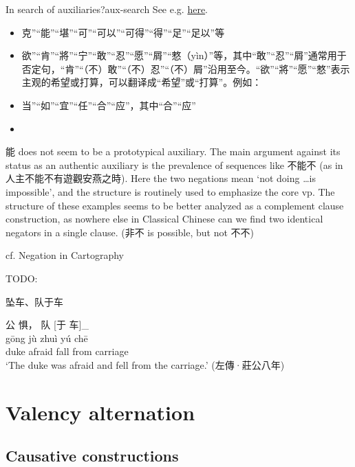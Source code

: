 \documentclass[UTF8, a4paper, oneside, scheme=plain, 12pt]{ctexrep}
\newcommand{\translate}[1]{`#1'}
\begin{document}
\begin{todobox}{In search of auxiliaries?}{aux-search}
    See e.g. \href{http://www.ziyexing.com/files-5/guhanyu/guhanyu_3_1.htm}{here}.
    \begin{itemize}
        \item 克”“能”“堪”“可”“可以”“可得”“得”“足”“足以”等
        \item 欲”“肯”“將”“宁”“敢”“忍”“愿”“屑”“憗（yìn）”等，其中“敢”“忍”“屑”通常用于否定句，“肯”“（不）敢”“（不）忍”“（不）屑”沿用至今。“欲”“將”“愿”“憗”表示主观的希望或打算，可以翻译成“希望”或“打算”。例如：
        \item 当”“如”“宜”“任”“合”“应”，其中“合”“应”
        \item 
    \end{itemize}
    
    能 does not seem to be a prototypical auxiliary.
    The main argument against its status as an authentic auxiliary is the prevalence of sequences like 不能不 (as in 人主不能不有遊觀安燕之時).
    Here the two negations mean \translate{not doing \dots is impossible},
    and the structure is routinely used to emphasize the core \ac{vp}.
    The structure of these examples seems to be better analyzed as a complement clause construction,
    as nowhere else in Classical Chinese can we find two identical negators in a single clause.
    (非不 is possible, but not 不不)

    cf. Negation in Cartography
\end{todobox}

TODO: 

坠车、队于车

\begin{exe}
\ex\label{ex:grammatical.clause.verbal.argument.prepositional.fall.1} 
    \glll 公 惧， 队 [于 车]_{\textbf{}} \\
    gōng jù zhuì yú chē \\
    duke afraid fall from carriage \\
    \glt\translate{The duke was afraid and fell from the carriage.} \hfill (左傳·莊公八年)
\end{exe}

\chapter{Valency alternation}

\section{Causative constructions}\label{sec:grammatical.clause.verbal.argument-structure.causative}
\end{document}
